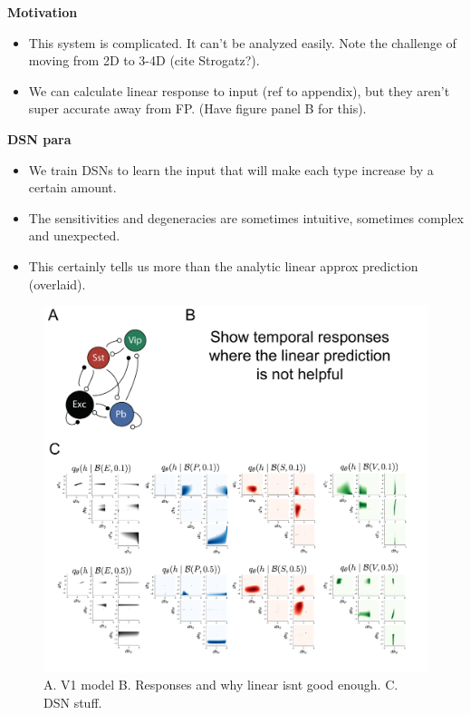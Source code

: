 \documentclass[11pt]{article}
\begin{document}
\textbf{Motivation}
\begin{itemize}
\item This system is complicated.  It can't be analyzed easily.  Note the challenge of moving from 2D to 3-4D (cite Strogatz?).
\item We can calculate linear response to input (ref to appendix), but they aren't super accurate away from FP. (Have figure panel B for this).
\end{itemize}

\textbf{DSN para}
\begin{itemize}
\item We train DSNs to learn the input that will make each type increase by a certain amount.
\item The sensitivities and degeneracies are sometimes intuitive, sometimes complex and unexpected.
\item This certainly tells us more than the analytic linear approx prediction (overlaid).
\end{itemize}

\begin{figure}
\begin{center}
\includegraphics[scale=0.4]{figs/fig3/fig3.pdf}
\end{center}
\caption{A. V1 model B. Responses and why linear isnt good enough. C. DSN stuff.}
\end{figure}
\end{document}

